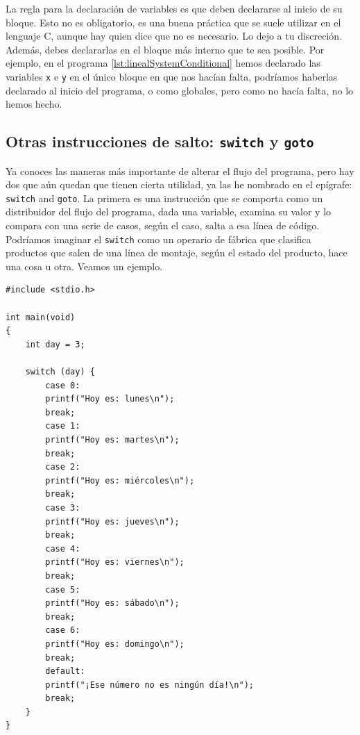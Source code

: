 \documentclass[a4paper]{article}
\begin{document}
La regla para la declaración de variables es que deben declararse al inicio
de su bloque. Esto no es obligatorio, es una buena práctica que se suele
utilizar en el lenguaje C, aunque hay quien dice que no es necesario. Lo dejo
a tu discreción.
Además, debes declararlas en el bloque más interno que te sea
posible. Por ejemplo, en el programa \ref{lst:linealSystemConditional}
hemos declarado
las variables \texttt{x} e \texttt{y} en el único bloque en que nos hacían
falta, podríamos haberlas declarado al inicio del programa, o como globales,
pero como no hacía falta, no lo hemos hecho.

\subsection{Otras instrucciones de salto: \texttt{switch} y \texttt{goto}}
Ya conoces las maneras más importante de alterar el flujo del programa,
pero hay dos que aún
quedan que tienen cierta utilidad, ya las he nombrado en el epígrafe:
\verb!switch! and \verb!goto!. La primera es una instrucción que se comporta
como un distribuidor del flujo del programa, dada una variable, examina su valor
y lo compara con una serie de casos, según el caso, salta a esa línea de código.
Podríamos imaginar el \verb!switch! como un operario de fábrica que clasifica
productos que salen de una línea de montaje, según el estado del producto, hace
una cosa u otra. Veamos un ejemplo.


\noindent
\begin{minipage}[H]{\linewidth}
\mbox{}
\begin{lstlisting}[style=C,
caption={Ejemplo de programa con un \texttt{switch}},
label={lst:switchExample}]
#include <stdio.h>

int main(void)
{
    int day = 3;

    switch (day) {
        case 0:
        printf("Hoy es: lunes\n");
        break;
        case 1:
        printf("Hoy es: martes\n");
        break;
        case 2:
        printf("Hoy es: miércoles\n");
        break;
        case 3:
        printf("Hoy es: jueves\n");
        break;
        case 4:
        printf("Hoy es: viernes\n");
        break;
        case 5:
        printf("Hoy es: sábado\n");
        break;
        case 6:
        printf("Hoy es: domingo\n");
        break;
        default:
        printf("¡Ese número no es ningún día!\n");
        break;
    }
}
\end{lstlisting}
\end{minipage}
\end{document}
